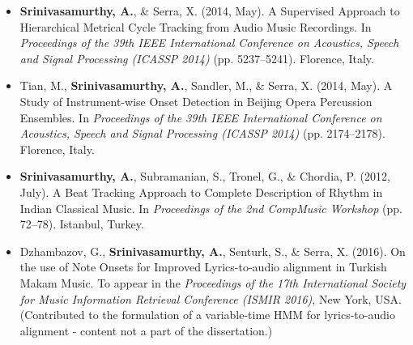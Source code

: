 \begin{itemize}[leftmargin=*]
	\item \textbf{Srinivasamurthy, A.}, \& Serra, X. (2014, May). A Supervised Approach to Hierarchical Metrical Cycle Tracking from Audio Music Recordings. In \emph{Proceedings of the 39th IEEE International Conference on Acoustics, Speech and Signal Processing (ICASSP 2014)} (pp. 5237--5241). Florence, Italy.  %
	\item Tian, M., \textbf{Srinivasamurthy, A.}, Sandler, M., \& Serra, X. (2014, May). A Study of Instrument-wise Onset Detection in Beijing Opera Percussion Ensembles. In \emph{Proceedings of the 39th IEEE International Conference on Acoustics, Speech and Signal Processing (ICASSP 2014)} (pp. 2174--2178). Florence, Italy.  %
	\item \textbf{Srinivasamurthy, A.}, Subramanian, S., Tronel, G., \& Chordia, P. (2012, July). A Beat Tracking Approach to Complete Description of Rhythm in Indian Classical Music. In \emph{Proceedings of the 2nd CompMusic Workshop} (pp. 72--78). Istanbul, Turkey. 
	\item Dzhambazov, G., \textbf{Srinivasamurthy, A.}, Senturk, S., \& Serra, X. (2016). On the use of Note Onsets for Improved Lyrics-to-audio alignment in Turkish Makam Music. To appear in the \emph{Proceedings of the 17th International Society for Music Information Retrieval Conference (ISMIR 2016)}, New York, USA. {\footnotesize (Contributed to the formulation of a variable-time  {HMM} for lyrics-to-audio alignment -  content not a part of the dissertation.)}
\end{itemize}
%
